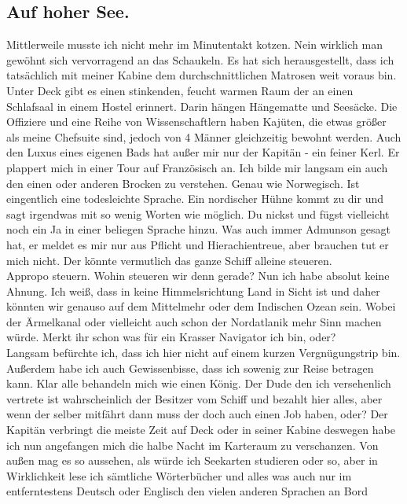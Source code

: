 \documentclass{article}
\begin{document}
\subsection{
  Auf hoher See.
}
\noindent 
Mittlerweile musste ich nicht mehr im Minutentakt kotzen. Nein wirklich man gewöhnt
sich vervorragend an das Schaukeln. Es hat sich herausgestellt, dass ich tatsächlich mit meiner Kabine dem
durchschnittlichen Matrosen weit voraus bin. Unter Deck gibt es einen stinkenden, feucht warmen Raum der an
einen Schlafsaal in einem Hostel erinnert. Darin hängen Hängematte und Seesäcke. Die Offiziere und eine Reihe
von Wissenschaftlern haben Kajüten, die etwas größer als meine Chefsuite sind, jedoch von 4 Männer gleichzeitig
bewohnt werden. Auch den Luxus eines eigenen Bads hat außer mir nur der Kapitän - ein feiner Kerl. Er plappert
mich in einer Tour auf Französisch an. Ich bilde mir langsam ein auch den einen oder anderen Brocken zu
verstehen. Genau wie Norwegisch. Ist eingentlich eine todesleichte Sprache. Ein nordischer Hühne kommt zu dir
und sagt irgendwas mit so wenig Worten wie möglich. Du nickst und fügst vielleicht noch ein Ja in einer beliegen
Sprache hinzu. Was auch immer Admunson gesagt hat, er meldet es mir nur aus Pflicht und Hierachientreue, aber
brauchen tut er mich nicht. Der könnte vermutlich das ganze Schiff alleine steueren.
\\
\noindent 
Appropo steuern. Wohin steueren wir denn gerade? Nun ich habe absolut keine Ahnung. Ich weiß, dass in keine
Himmelsrichtung Land in Sicht ist und daher könnten wir genauso auf dem Mittelmehr oder dem Indischen Ozean
sein. Wobei der Ärmelkanal oder vielleicht auch schon der Nordatlanik mehr Sinn machen würde. Merkt ihr schon
was für ein Krasser Navigator ich bin, oder?
\\
\noindent 
Langsam befürchte ich, dass ich hier nicht auf einem kurzen Vergnügungstrip bin. Außerdem habe ich auch
Gewissenbisse, dass ich sowenig zur Reise betragen kann. Klar alle behandeln mich wie einen König. Der Dude den
ich versehenlich vertrete ist wahrscheinlich der Besitzer vom Schiff und bezahlt hier alles, aber wenn der
selber mitfährt dann muss der doch auch einen Job haben, oder? Der Kapitän verbringt die meiste Zeit auf Deck
oder in seiner Kabine deswegen habe ich nun angefangen mich die halbe Nacht im Karteraum zu verschanzen. Von
außen mag es so aussehen, als würde ich Seekarten studieren oder so, aber in Wirklichkeit lese ich sämtliche
Wörterbücher und alles was auch nur im entferntestens Deutsch oder Englisch den vielen anderen Sprachen an Bord
\end{document}
